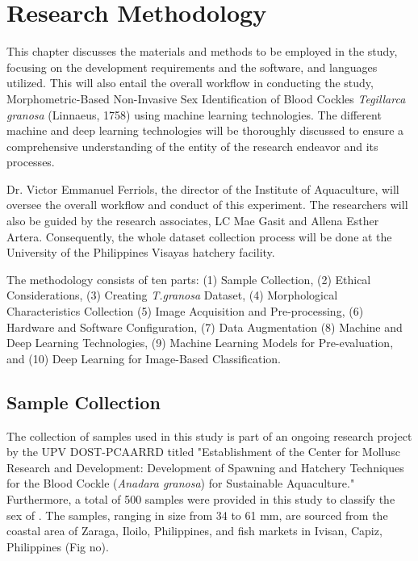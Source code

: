 \chapter{Research Methodology}
\label{sec:methodology}

This chapter discusses the materials and methods to be employed in the study, focusing on the development requirements and the software, and languages utilized. This will also entail the overall workflow in conducting the study, Morphometric-Based Non-Invasive Sex Identification of Blood Cockles \textit{Tegillarca granosa} (Linnaeus, 1758) using machine learning technologies. The different machine and deep learning technologies will be thoroughly discussed to ensure a comprehensive understanding of the entity of the research endeavor and its processes. 

Dr. Victor Emmanuel Ferriols, the director of the Institute of Aquaculture, will oversee the overall workflow and conduct of this experiment. The researchers will also be guided by the research associates, LC Mae Gasit and Allena Esther Artera. Consequently, the whole dataset collection process will be done at the University of the Philippines Visayas hatchery facility. 

The methodology consists of ten parts: (1) Sample Collection, (2) Ethical Considerations, (3) Creating \textit{T.granosa} Dataset, (4) Morphological Characteristics Collection (5) Image Acquisition and Pre-processing, (6) Hardware and Software Configuration, (7) Data Augmentation (8) Machine and Deep Learning Technologies, (9) Machine Learning Models for Pre-evaluation, and (10) Deep Learning for Image-Based Classification. 

\section{Sample Collection}
\label{sec:samplecollect}
The collection of \Tgranosa samples used in this study is part of an ongoing research project by the UPV DOST-PCAARRD titled "Establishment of the Center for Mollusc Research and Development: Development of Spawning and Hatchery Techniques for the Blood Cockle (\textit{Anadara granosa}) for Sustainable Aquaculture." Furthermore, a total of 500 samples were provided in this study to classify the sex of \Tgranosa.  The samples, ranging in size from 34 to 61 mm, are sourced from the coastal area of Zaraga, Iloilo, Philippines, and fish markets in Ivisan, Capiz, Philippines (Fig no). 

